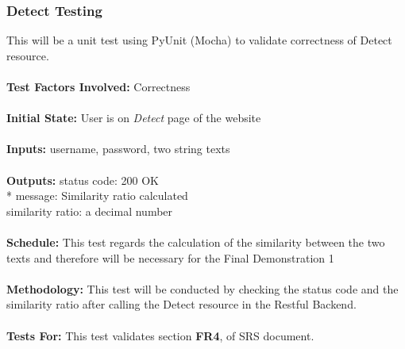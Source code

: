 \documentclass[12pt, titlepage]{article}
\begin{document}
\subsubsection{{Detect Testing}}
This will be a unit test using PyUnit (Mocha) to validate correctness of Detect resource. \\
\\
\textbf{Test Factors Involved:} Correctness \\
\\
\textbf{Initial State: } User is on \textit{Detect} page of the website \\
\\
\textbf{Inputs: } username, password, two string texts \\
\\
\textbf{Outputs:} status code: 200 OK \\*
                  message: Similarity ratio calculated \\
                  similarity ratio: a decimal number \\
\\
\textbf{Schedule:} This test regards the calculation of the similarity between the two texts and therefore will be necessary for the Final Demonstration 1 \\
\\
\textbf{Methodology: } This test will be conducted by checking the status code and the similarity ratio after calling the Detect resource in the Restful Backend. \\
\\
\textbf{Tests For:} This test validates section \textbf{FR4}, of SRS document.

\end{document}
